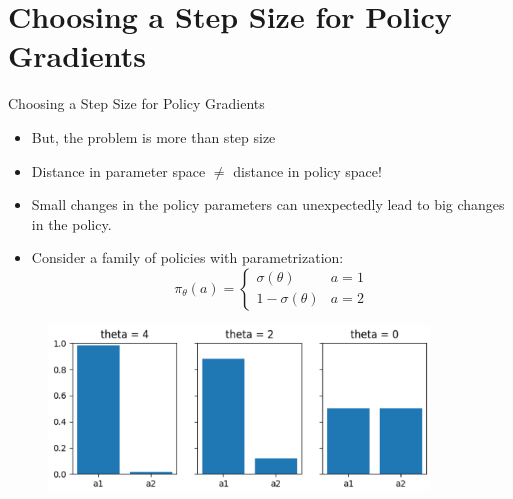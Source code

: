 \section{Choosing a Step Size for Policy Gradients}
\begin{frame}{Choosing a Step Size for Policy Gradients}
\begin{itemize}
    \item But, the problem is more than step size
    \item Distance in parameter space $\ne$ distance in policy space!
    \item Small changes in the policy parameters can unexpectedly lead to big changes in the policy.
    \pause
    \item Consider a family of policies with parametrization:
    \[ \pi_\theta(a) = \begin{cases} 
          \sigma(\theta) & a = 1 \\
          1 - \sigma(\theta) & a=2 
       \end{cases}
    \]
    \pause
    
\end{itemize}
\begin{figure}
\centering
\includegraphics[width=0.9\textwidth,height=0.4\textheight,keepaspectratio]{images/policy-search/step_2.png}
\end{figure}
    
\end{frame}